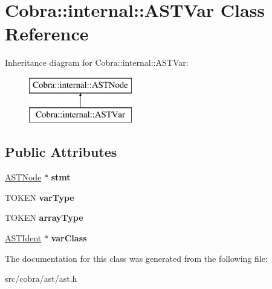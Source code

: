 \hypertarget{class_cobra_1_1internal_1_1_a_s_t_var}{\section{Cobra\+:\+:internal\+:\+:A\+S\+T\+Var Class Reference}
\label{class_cobra_1_1internal_1_1_a_s_t_var}
}
Inheritance diagram for Cobra\+:\+:internal\+:\+:A\+S\+T\+Var\+:\begin{figure}[H]
\begin{center}
\leavevmode
\includegraphics[height=2.000000cm]{class_cobra_1_1internal_1_1_a_s_t_var}
\end{center}
\end{figure}
\subsection*{Public Attributes}
\begin{DoxyCompactItemize}
\item 
\hypertarget{class_cobra_1_1internal_1_1_a_s_t_var_ae331fbe5e112d08352e5c47f26be5c32}{\hyperlink{class_cobra_1_1internal_1_1_a_s_t_node}{A\+S\+T\+Node} $\ast$ {\bfseries stmt}}\label{class_cobra_1_1internal_1_1_a_s_t_var_ae331fbe5e112d08352e5c47f26be5c32}

\item 
\hypertarget{class_cobra_1_1internal_1_1_a_s_t_var_a86c85537f17d498f5b0fcf15e22e76ad}{T\+O\+K\+E\+N {\bfseries var\+Type}}\label{class_cobra_1_1internal_1_1_a_s_t_var_a86c85537f17d498f5b0fcf15e22e76ad}

\item 
\hypertarget{class_cobra_1_1internal_1_1_a_s_t_var_a0e2e0adc76754328f4d85a8616daded2}{T\+O\+K\+E\+N {\bfseries array\+Type}}\label{class_cobra_1_1internal_1_1_a_s_t_var_a0e2e0adc76754328f4d85a8616daded2}

\item 
\hypertarget{class_cobra_1_1internal_1_1_a_s_t_var_a6a00a268063517fbe45c2a9700f2c117}{\hyperlink{class_cobra_1_1internal_1_1_a_s_t_ident}{A\+S\+T\+Ident} $\ast$ {\bfseries var\+Class}}\label{class_cobra_1_1internal_1_1_a_s_t_var_a6a00a268063517fbe45c2a9700f2c117}

\end{DoxyCompactItemize}


The documentation for this class was generated from the following file\+:\begin{DoxyCompactItemize}
\item 
src/cobra/ast/ast.\+h\end{DoxyCompactItemize}
